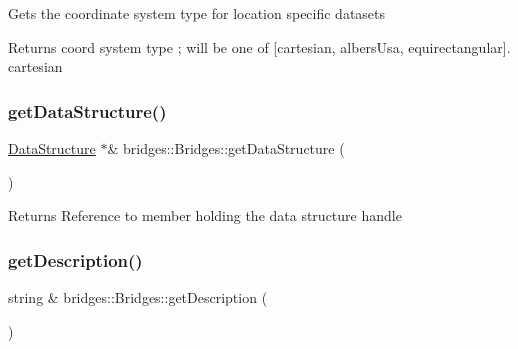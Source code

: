 Gets the coordinate system type for location specific datasets

\begin{DoxyReturn}{Returns}
coord system type ; will be one of \mbox{[}\textquotesingle{}cartesian\textquotesingle{}, \textquotesingle{}albers\+Usa\textquotesingle{}, \textquotesingle{}equirectangular\textquotesingle{}\mbox{]}. \textquotesingle{}cartesian\textquotesingle{} 
\end{DoxyReturn}
\mbox{\label{namespacebridges_1_1_bridges_a7cee9c57a0cd6a213722ba0a81a742f0}} 
\subsubsection{\texorpdfstring{get\+Data\+Structure()}{getDataStructure()}}
{\footnotesize\ttfamily \mbox{\hyperlink{classbridges_1_1_data_structure}{Data\+Structure}} $\ast$\& bridges\+::\+Bridges\+::get\+Data\+Structure (\begin{DoxyParamCaption}{ }\end{DoxyParamCaption})}

\begin{DoxyReturn}{Returns}
Reference to member holding the data structure handle 
\end{DoxyReturn}
\mbox{\label{namespacebridges_1_1_bridges_a11570abeb2d710440c709bafca816a64}} 
\subsubsection{\texorpdfstring{get\+Description()}{getDescription()}}
{\footnotesize\ttfamily string \& bridges\+::\+Bridges\+::get\+Description (\begin{DoxyParamCaption}{ }\end{DoxyParamCaption})}

\mbox{\label{namespacebridges_1_1_bridges_a6a7303bf89edfe41c19f30b4cc6430b9}} 
